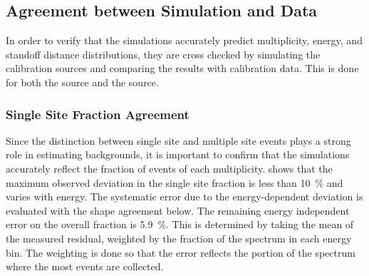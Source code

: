 \documentclass[herrin-thesis.tex]{subfiles}
\begin{document}
\subsection{Agreement between Simulation and Data}
In order to verify that the simulations accurately predict multiplicity, energy, and standoff distance distributions, they are cross checked by simulating the calibration sources and comparing the results with calibration data. This is done for both the  source and the  source.

\subsubsection{Single Site Fraction Agreement}
\label{sec:analysis_ss_frac_agreement}
Since the distinction between single site and multiple site events plays a strong role in estimating backgrounds, it is important to confirm that the simulations accurately reflect the fraction of events of each multiplicity.  shows that the maximum observed deviation in the single site fraction is less than \SI{10}{\percent} and varies with energy. The systematic error due to the energy-dependent deviation is evaluated with the shape agreement below. The remaining energy independent error on the overall fraction is \SI{5.9}{\percent}. This is determined by taking the mean of the measured residual, weighted by the fraction of the \twonu{} spectrum in each energy bin. The weighting is done so that the error reflects the portion of the spectrum where the most events are collected.
\end{document}
